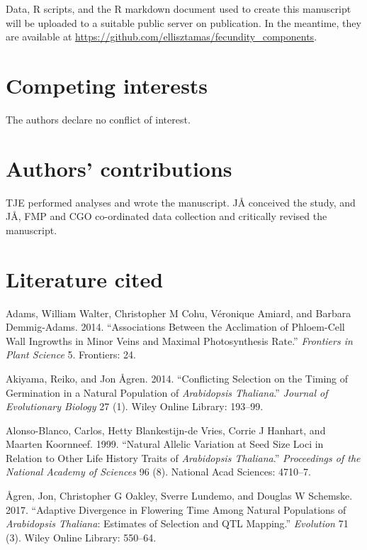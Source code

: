 \documentclass[]{article}
\begin{document}
Data, R scripts, and the R markdown document used to create this manuscript will be uploaded to a suitable public server on publication. In the meantime, they are available at \url{https://github.com/ellisztamas/fecundity_components}.

\hypertarget{competing-interests}{%
\section{Competing interests}\label{competing-interests}}

The authors declare no conflict of interest.

\hypertarget{authors-contributions}{%
\section{Authors' contributions}\label{authors-contributions}}

TJE performed analyses and wrote the manuscript. JÅ conceived the study, and JÅ, FMP and CGO co-ordinated data collection and critically revised the manuscript.

\hypertarget{literature-cited}{%
\section{Literature cited}\label{literature-cited}}

\hypertarget{refs}{}
\leavevmode\hypertarget{ref-adams2014associations}{}%
Adams, William Walter, Christopher M Cohu, Véronique Amiard, and Barbara Demmig-Adams. 2014. ``Associations Between the Acclimation of Phloem-Cell Wall Ingrowths in Minor Veins and Maximal Photosynthesis Rate.'' \emph{Frontiers in Plant Science} 5. Frontiers: 24.

\leavevmode\hypertarget{ref-akiyama2014conflicting}{}%
Akiyama, Reiko, and Jon Ågren. 2014. ``Conflicting Selection on the Timing of Germination in a Natural Population of \emph{Arabidopsis Thaliana}.'' \emph{Journal of Evolutionary Biology} 27 (1). Wiley Online Library: 193--99.

\leavevmode\hypertarget{ref-alonso1999natural}{}%
Alonso-Blanco, Carlos, Hetty Blankestijn-de Vries, Corrie J Hanhart, and Maarten Koornneef. 1999. ``Natural Allelic Variation at Seed Size Loci in Relation to Other Life History Traits of \emph{Arabidopsis Thaliana}.'' \emph{Proceedings of the National Academy of Sciences} 96 (8). National Acad Sciences: 4710--7.

\leavevmode\hypertarget{ref-agren_flowering_time}{}%
Ågren, Jon, Christopher G Oakley, Sverre Lundemo, and Douglas W Schemske. 2017. ``Adaptive Divergence in Flowering Time Among Natural Populations of \emph{Arabidopsis Thaliana}: Estimates of Selection and QTL Mapping.'' \emph{Evolution} 71 (3). Wiley Online Library: 550--64.
\end{document}
